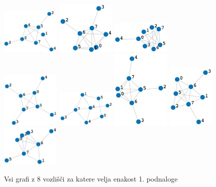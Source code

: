 \documentclass[12pt,a4paper]{amsart}
\theoremstyle{plain} %
\begin{document}
\bigskip
\begin{figure}[h]
    \centering
    \includegraphics[width=0.25\textwidth]{slike/graf1.png}
    \includegraphics[width=0.25\textwidth]{slike/graf2.png}
    \includegraphics[width=0.25\textwidth]{slike/graf3.png}
    \includegraphics[width=0.25\textwidth]{slike/graf4.png}
    \includegraphics[width=0.25\textwidth]{slike/graf5.png}
    \includegraphics[width=0.25\textwidth]{slike/graf6.png}
    \includegraphics[width=0.2\textwidth]{slike/graf7.png}
    \includegraphics[width=0.25\textwidth]{slike/graf8.png}
    \caption{Vsi grafi z 8 vozlišči za katere velja enakost 1. podnaloge}
    \label{fig:slika1}
\end{figure}
\end{document}

